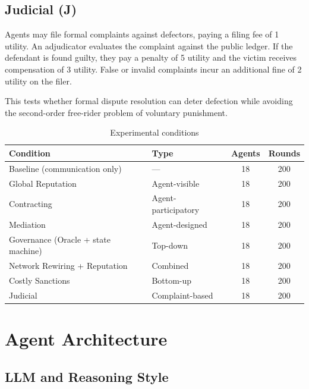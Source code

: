 \documentclass{article}
\begin{document}
\subsection{Judicial (J)}

Agents may file formal complaints against defectors, paying a filing fee of 1 utility. An adjudicator evaluates the complaint against the public ledger. If the defendant is found guilty, they pay a penalty of 5 utility and the victim receives compensation of 3 utility. False or invalid complaints incur an additional fine of 2 utility on the filer.

This tests whether formal dispute resolution can deter defection while avoiding the second-order free-rider problem of voluntary punishment.

\begin{table}[H]
\centering
\begin{tabular}{@{}llcc@{}}
\toprule
Condition & Type & Agents & Rounds \\
\midrule
Baseline (communication only)       & ---                  & 18 & 200 \\
Global Reputation                   & Agent-visible        & 18 & 200 \\
Contracting                         & Agent-participatory  & 18 & 200 \\
Mediation                           & Agent-designed       & 18 & 200 \\
Governance (Oracle + state machine) & Top-down             & 18 & 200 \\
Network Rewiring + Reputation       & Combined             & 18 & 200 \\
Costly Sanctions                    & Bottom-up            & 18 & 200 \\
Judicial                            & Complaint-based      & 18 & 200 \\
\bottomrule
\end{tabular}
\caption{Experimental conditions}
\label{tab:conditions}
\end{table}

\section{Agent Architecture}
\label{sec:agents}

\subsection{LLM and Reasoning Style}
\end{document}
